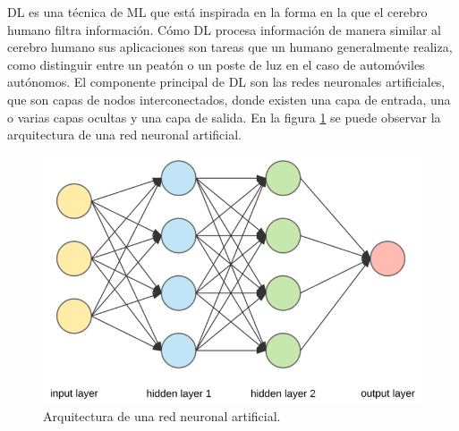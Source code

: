 DL es una técnica de ML  que está inspirada en la forma en la que el cerebro humano filtra información. Cómo DL procesa información de manera similar al cerebro humano sus aplicaciones son tareas que un humano generalmente realiza, como distinguir entre un peatón o un poste de luz en el caso de automóviles autónomos. El componente principal de DL son las redes neuronales artificiales, que son capas de nodos interconectados, donde existen una capa de entrada, una o varias capas ocultas y una capa de salida. En la figura \ref{fig:neural_network} se puede observar la arquitectura de una red neuronal artificial.
\begin{figure}[h]
	\centering
	\includegraphics[scale=0.4]{./Figures/neural_network.png}
	\caption{Arquitectura de una red neuronal artificial.}
	\label{fig:neural_network}
\end{figure}

